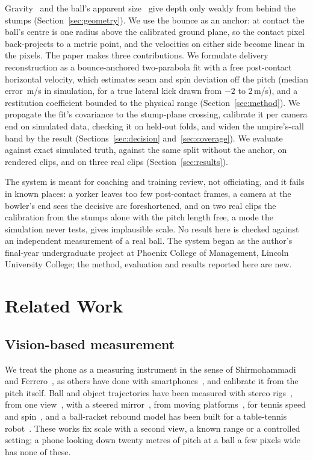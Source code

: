 \documentclass[journal]{IEEEtran}
\begin{document}
Gravity~\cite{ribnick2009projectiles} and the ball's apparent size~\cite{vanzandycke2022ball3d} give depth
only weakly from behind the stumps (Section~\ref{sec:geometry}). We use the bounce as an anchor: at contact
the ball's centre is one radius above the calibrated ground plane, so the contact pixel back-projects to a
metric point, and the velocities on either side become linear in the pixels. The paper makes three
contributions. We formulate delivery reconstruction as a bounce-anchored
two-parabola fit with a free post-contact horizontal velocity, which estimates seam and spin deviation off the pitch
(median error \GeoMedDevErr\,m/s in simulation, for a true lateral kick drawn from $-2$ to
2\,m/s), and a restitution coefficient bounded to
the physical range (Section~\ref{sec:method}). We propagate the fit's covariance to the stump-plane
crossing, calibrate it per camera end on simulated data, checking it on held-out folds, and widen the umpire's-call band by the result
(Sections~\ref{sec:decision} and~\ref{sec:coverage}). We evaluate against exact simulated truth, against the same split without
the anchor, on rendered clips, and on three real clips (Section~\ref{sec:results}).

The system is meant for coaching and training review, not officiating, and it fails in known places: a
yorker leaves too few post-contact frames, a camera at the bowler's end sees the decisive arc foreshortened,
and on two real clips the calibration from the stumps alone with the pitch length free, a mode the
simulation never tests, gives implausible scale. No result here is checked against an independent measurement of a real ball. The system began as the author's final-year undergraduate project
at Phoenix College of Management, Lincoln University College; the method, evaluation and results reported
here are new.

\section{Related Work}

\subsection{Vision-based measurement}

We treat the phone as a measuring instrument in the sense of Shirmohammadi and
Ferrero~\cite{shirmohammadi2014camera}, as others have done with smartphones~\cite{zhu2022smartphone6dof}, and
calibrate it from the pitch itself. Ball and object trajectories have been measured with stereo
rigs~\cite{zhang2010tabletennis}, from one view~\cite{huang2025monotraj}, with a steered
mirror~\cite{wang2024quasi1d}, from moving platforms~\cite{guo2026pose}, for tennis speed and
spin~\cite{zhu2026tennis}, and a ball-racket rebound model has been built for a table-tennis
robot~\cite{sun2024rebound}. These works fix scale with a second
view, a known range or a controlled setting; a phone looking down twenty metres of pitch at a ball
a few pixels wide has none of these.
\end{document}
